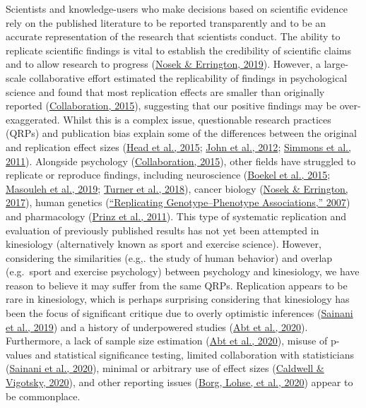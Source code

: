 \documentclass[]{cik}%
\begin{document}
Scientists and knowledge-users who make decisions based on scientific
evidence rely on the published literature to be reported transparently
and to be an accurate representation of the research that scientists
conduct. The ability to replicate scientific findings is vital to
establish the credibility of scientific claims and to allow research to
progress (\protect\hyperlink{ref-NosekErrington2019}{Nosek \& Errington,
2019}). However, a large-scale collaborative effort estimated the
replicability of findings in psychological science and found that most
replication effects are smaller than originally reported
(\protect\hyperlink{ref-collaboration_estimating_2015}{Collaboration,
2015}), suggesting that our positive findings may be over-exaggerated.
Whilst this is a complex issue, questionable research practices (QRPs)
and publication bias explain some of the differences between the
original and replication effect sizes
(\protect\hyperlink{ref-head_extent_2015}{Head et al., 2015};
\protect\hyperlink{ref-John_Loewenstein_Prelec_2012}{John et al., 2012};
\protect\hyperlink{ref-simmons_false-positive_2011}{Simmons et al.,
2011}). Alongside psychology
(\protect\hyperlink{ref-collaboration_estimating_2015}{Collaboration,
2015}), other fields have struggled to replicate or reproduce findings,
including neuroscience
(\protect\hyperlink{ref-Boekel_Wagenmakers_Belay_Verhagen_Brown_Forstmann_2015}{Boekel
et al., 2015}; \protect\hyperlink{ref-Kharabian_Genon_2019}{Masouleh et
al., 2019};
\protect\hyperlink{ref-Turner_Paul_Miller_Barbey_2018}{Turner et al.,
2018}), cancer biology
(\protect\hyperlink{ref-Nosek_Errington_2017}{Nosek \& Errington,
2017}), human genetics
(\protect\hyperlink{ref-chanock_2007}{{``Replicating Genotype--Phenotype
Associations,''} 2007}) and pharmacology
(\protect\hyperlink{ref-Prinz_Schlange_Asadullah_2011}{Prinz et al.,
2011}). This type of systematic replication and evaluation of previously
published results has not yet been attempted in kinesiology
(alternatively known as sport and exercise science). However,
considering the similarities (e.g,. the study of human behavior) and
overlap (e.g.~sport and exercise psychology) between psychology and
kinesiology, we have reason to believe it may suffer from the same QRPs.
Replication appears to be rare in kinesiology, which is perhaps
surprising considering that kinesiology has been the focus of
significant critique due to overly optimistic inferences
(\protect\hyperlink{ref-Sainani_Lohse_Jones_Vickers_2019}{Sainani et
al., 2019}) and a history of underpowered studies
(\protect\hyperlink{ref-Abt_Boreham_Davison_Jackson_Nevill_Wallace_Williams_2020}{Abt
et al., 2020}). Furthermore, a lack of sample size estimation
(\protect\hyperlink{ref-Abt_Boreham_Davison_Jackson_Nevill_Wallace_Williams_2020}{Abt
et al., 2020}), misuse of p-values and statistical significance testing,
limited collaboration with statisticians
(\protect\hyperlink{ref-sainani2020}{Sainani et al., 2020}), minimal or
arbitrary use of effect sizes
(\protect\hyperlink{ref-Caldwell_Vigotsky_2020}{Caldwell \& Vigotsky,
2020}), and other reporting issues
(\protect\hyperlink{ref-Borg_Lohse_Sainani_2020}{Borg, Lohse, et al.,
2020}) appear to be commonplace.
\end{document}
